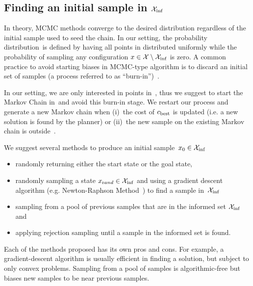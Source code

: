 \documentclass[letterpaper, 10 pt, conference]{ieeeconf}  %
\begin{document}
\subsection{Finding an initial sample in $\mathcal{X}_{\rm {inf}}$}
In theory, MCMC methods converge to the desired distribution regardless of the initial sample used to seed the chain.
In our setting, the probability distribution~\Pinf is defined by having all points in \Cinf distributed uniformly
while 
the probability of sampling any configuration $x \in \mathcal{X} \setminus \mathcal{X}_{\rm {inf}}$ is zero.
A common practice to avoid starting biases in MCMC-type algorithm is to discard an initial set of samples (a process referred to as ``burn-in'')~\cite{ADDJ03}. 

In our setting, we are only interested in points in~\Cinf, thus we suggest to start the Markov Chain in~\Cinf and avoid this burn-in stage. 
We restart our process and generate a new Markov chain  when 
(i)~the cost of $c_{\rm best}$ is updated (i.e. a new solution is found by the planner) or
(ii)~the new sample on the existing Markov chain is outside~\Cinf.

We suggest several methods to produce an initial sample~$x_0 \in \mathcal{X}_{\rm {inf}} $ 
\begin{itemize}
	\item randomly returning either the start state or the goal state,
	\item randomly sampling a state $x_{\text rand} \in \mathcal{X}_{\rm {inf}}$ and using a gradient descent algorithm (e.g. Newton-Raphson Method~\cite{RT06}) to find a sample in~$ \mathcal{X}_{\rm {inf}} $
	\item sampling from a pool of previous samples that are in the informed set $ \mathcal{X}_{\rm {inf}} $ and
	\item applying rejection sampling until a sample in the informed set is found.
\end{itemize}

Each of the methods proposed has its own pros and cons.
For example, a gradient-descent algorithm is usually efficient in finding a solution, but subject to only convex problems.
Sampling from a pool of samples is algorithmic-free but biases new samples to be near previous samples.

\end{document}
